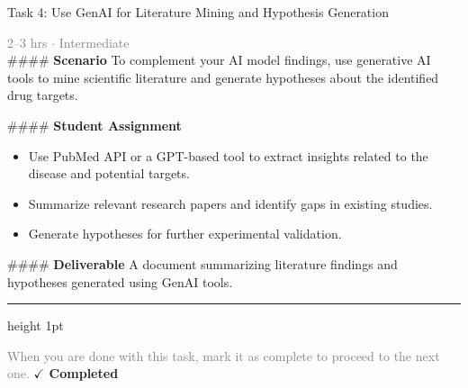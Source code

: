 \documentclass[10pt,a4paper]{article}
\begin{document}
\begin{taskbox}{Task 4: Use GenAI for Literature Mining and Hypothesis Generation}

    {\small \textcolor{gray}{2--3 hrs $\cdot$ Intermediate}}\\[12pt]

    \#\#\#\# \textbf{Scenario}
To complement your AI model findings, use generative AI tools to mine scientific literature and generate hypotheses about the identified drug targets.

\#\#\#\# \textbf{Student Assignment}
\begin{itemize}
    \item Use PubMed API or a GPT-based tool to extract insights related to the disease and potential targets.
    \item Summarize relevant research papers and identify gaps in existing studies.
    \item Generate hypotheses for further experimental validation.
\end{itemize}

\#\#\#\# \textbf{Deliverable}
A document summarizing literature findings and hypotheses generated using GenAI tools.\par

    \vspace{16pt}

    \textcolor{cardBorder}{\hrule height 1pt}\vspace{8pt}

    \small \textcolor{gray}{When you are done with this task, mark it as complete to proceed to the next one.} \hfill \textbf{\textcolor{brandDark}{$\checkmark$ Completed}}

\end{taskbox}
\end{document}

